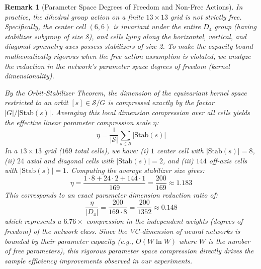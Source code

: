 \documentclass{article}
\newtheorem{remark}[theorem]{Remark}
\begin{document}
\begin{remark}[Parameter Space Degrees of Freedom and Non-Free Actions]
In practice, the dihedral group action on a finite $13 \times 13$ grid is not strictly free. Specifically, the center cell $(6,6)$ is invariant under the entire $D_4$ group (having stabilizer subgroup of size 8), and cells lying along the horizontal, vertical, and diagonal symmetry axes possess stabilizers of size 2. To make the capacity bound mathematically rigorous when the free action assumption is violated, we analyze the reduction in the network's parameter space degrees of freedom (kernel dimensionality). 

By the Orbit-Stabilizer Theorem, the dimension of the equivariant kernel space restricted to an orbit $[s] \in \mathcal{S}/G$ is compressed exactly by the factor $|G|/|\mathrm{Stab}(s)|$. Averaging this local dimension compression over all cells yields the effective linear parameter compression scale $\eta$:
\begin{equation}
    \eta = \frac{1}{|\mathcal{S}|} \sum_{s \in \mathcal{S}} |\mathrm{Stab}(s)|
\end{equation}
In a $13 \times 13$ grid ($169$ total cells), we have: (i) $1$ center cell with $|\mathrm{Stab}(s)|=8$, (ii) $24$ axial and diagonal cells with $|\mathrm{Stab}(s)|=2$, and (iii) $144$ off-axis cells with $|\mathrm{Stab}(s)|=1$. Computing the average stabilizer size gives:
\begin{equation}
    \eta = \frac{1 \cdot 8 + 24 \cdot 2 + 144 \cdot 1}{169} = \frac{200}{169} \approx 1.183
\end{equation}
This corresponds to an exact parameter dimension reduction ratio of:
\begin{equation}
    \frac{\eta}{|D_4|} = \frac{200}{169 \cdot 8} = \frac{200}{1352} \approx 0.148
\end{equation}
which represents a $6.76\times$ compression in the independent weights (degrees of freedom) of the network class. Since the VC-dimension of neural networks is bounded by their parameter capacity (e.g., $O(W \ln W)$ where $W$ is the number of free parameters), this rigorous parameter space compression directly drives the sample efficiency improvements observed in our experiments.
\end{remark}
\end{document}
